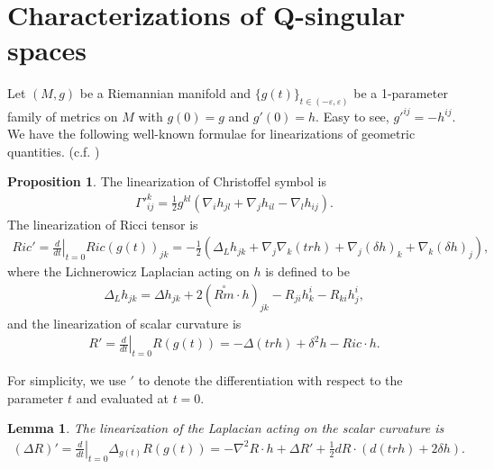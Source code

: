 \documentclass[12pt]{amsart}
\newtheorem{lemma}[theorem]{Lemma}
\theoremstyle{definition}
\newtheorem{proposition}[theorem]{Proposition}
\theoremstyle{remark}
\numberwithin{equation}{section}
\begin{document}
\section{Characterizations of Q-singular spaces}

Let $(M,g)$ be a Riemannian manifold and $\{g(t)\}_{t \in (-\varepsilon, \varepsilon)}$ be a 1-parameter family of metrics on $M$ with $g(0) =g$ and $g'(0) = h$. Easy to see, ${g'}^{ij} = - h^{ij}$.\\

We have the following well-known formulae for linearizations of geometric quantities. (c.f. \cite{C-L-N, F-M, Yuan})
\begin{proposition}
The linearization of Christoffel symbol is
\begin{align}
{\Gamma'}_{ij}^k = \frac{1}{2} g^{kl} \left( \nabla_i h_{jl} +\nabla_j h_{il} - \nabla_l h_{ij} \right).
\end{align}
\label{1st_variation_Ricci_scalar}
The linearization of Ricci tensor is
\begin{align}
Ric' = \left.\frac{d}{dt}\right|_{t=0}  Ric(g(t))_{jk} = - \frac{1}{2}\left( \Delta_L h_{jk} +
\nabla_j \nabla_k (tr h) + \nabla_j (\delta h)_k + \nabla_k (\delta
h)_j  \right),
\end{align}
where the Lichnerowicz Laplacian acting on $h$ is defined to be
\begin{align*}
\Delta_L h_{jk} = \Delta h_{jk} + 2 (\overset{\circ}{Rm}\cdot
h)_{jk} - R_{ji} h^i_k - R_{ki}h^i_j,
\end{align*}
and the linearization of scalar curvature is
\begin{align}\label{scalar_1st_variation}
R' = \left.\frac{d}{dt}\right|_{t=0}  R(g(t)) = - \Delta (tr h) +  \delta^2 h - Ric \cdot h.
\end{align}
\end{proposition}

For simplicity, we use $'$ to denote the differentiation with
respect to the parameter $t$ and evaluated at $t=0$.\\

\begin{lemma}
The linearization of the Laplacian acting on the scalar curvature is
\begin{align}\label{laplacian_scalar_variation}
(\Delta R)' = \left.\frac{d}{dt}\right|_{t=0}  \Delta_{g(t)} R(g(t)) = - \nabla^2 R\cdot h + \Delta
R' + \frac{1}{2} dR \cdot (d( tr h ) + 2\delta h).
\end{align}
\end{lemma}
\end{document}
